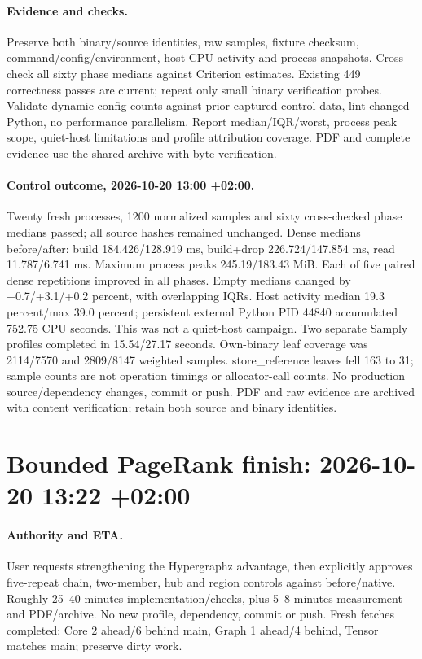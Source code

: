 \documentclass[11pt,a4paper]{article}
\begin{document}
\paragraph{Evidence and checks.} Preserve both binary/source identities, raw samples,
fixture checksum, command/config/environment, host CPU activity and process snapshots.
Cross-check all sixty phase medians against Criterion estimates. Existing 449 correctness
passes are current; repeat only small binary verification probes. Validate dynamic config
counts against prior captured control data, lint changed Python, no performance parallelism.
Report median/IQR/worst, process peak scope, quiet-host limitations and profile attribution
coverage. PDF and complete evidence use the shared archive with byte verification.

\paragraph{Control outcome, 2026-10-20 13:00 +02:00.} Twenty fresh processes,
1200 normalized samples and sixty cross-checked phase medians passed; all source
hashes remained unchanged. Dense medians before/after: build 184.426/128.919 ms,
build+drop 226.724/147.854 ms, read 11.787/6.741 ms. Maximum process peaks
245.19/183.43 MiB. Each of five paired dense repetitions improved in all phases.
Empty medians changed by +0.7/+3.1/+0.2 percent, with overlapping IQRs.
Host activity median 19.3 percent/max 39.0 percent; persistent external Python
PID 44840 accumulated 752.75 CPU seconds. This was not a quiet-host campaign.
Two separate Samply profiles completed in 15.54/27.17 seconds. Own-binary leaf
coverage was 2114/7570 and 2809/8147 weighted samples. store\_reference leaves
fell 163 to 31; sample counts are not operation timings or allocator-call counts.
No production source/dependency changes, commit or push. PDF and raw evidence
are archived with content verification; retain both source and binary identities.

\clearpage\section*{Bounded PageRank finish: 2026-10-20 13:22 +02:00}
\paragraph{Authority and ETA.} User requests strengthening the Hypergraphz advantage,
then explicitly approves five-repeat chain, two-member, hub and region controls against
before/native. Roughly 25--40 minutes implementation/checks, plus 5--8 minutes measurement
and PDF/archive. No new profile, dependency, commit or push. Fresh fetches completed:
Core 2 ahead/6 behind main, Graph 1 ahead/4 behind, Tensor matches main; preserve dirty work.
\end{document}
